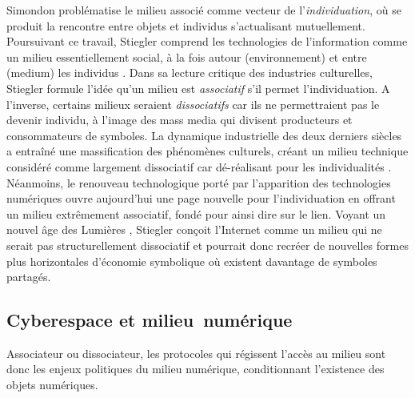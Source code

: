 Simondon problématise le milieu associé comme vecteur de l’\textit{individuation}, où se produit la rencontre entre objets et individus s'actualisant mutuellement. Poursuivant ce travail, Stiegler comprend les technologies de l’information comme un milieu essentiellement social, à la fois autour (environnement) et entre (medium) les individus \citep{Stiegler1998a}. Dans sa lecture critique des industries culturelles, Stiegler formule l’idée qu’un milieu est \textit{associatif} s’il permet l’individuation. A l’inverse, certains milieux seraient \textit{dissociatifs} car ils ne permettraient pas le devenir individu, à l’image des mass media qui divisent producteurs et consommateurs de symboles. La dynamique industrielle des deux derniers siècles a entraîné une massification des phénomènes culturels, créant un milieu technique considéré comme largement dissociatif car dé-réalisant pour les individualités \citep{Simondon1989}. Néanmoins, le renouveau technologique porté par l’apparition des technologies numériques ouvre aujourd’hui une page nouvelle pour l’individuation en offrant un milieu extrêmement associatif, fondé pour ainsi dire sur le lien. Voyant un nouvel âge des Lumières \citep{Stiegler2012}, Stiegler conçoit l’Internet comme un milieu qui ne serait pas structurellement dissociatif et pourrait donc recréer de nouvelles formes plus horizontales d’économie symbolique où existent davantage de symboles partagés. 

\subsection[Cyberespace et milieu numérique]{Cyberespace et milieu numérique}
\label{sec:cyber-milieu}

Associateur ou dissociateur, les protocoles qui régissent l’accès au milieu sont donc les enjeux politiques du milieu numérique, conditionnant l’existence des objets numériques. 


